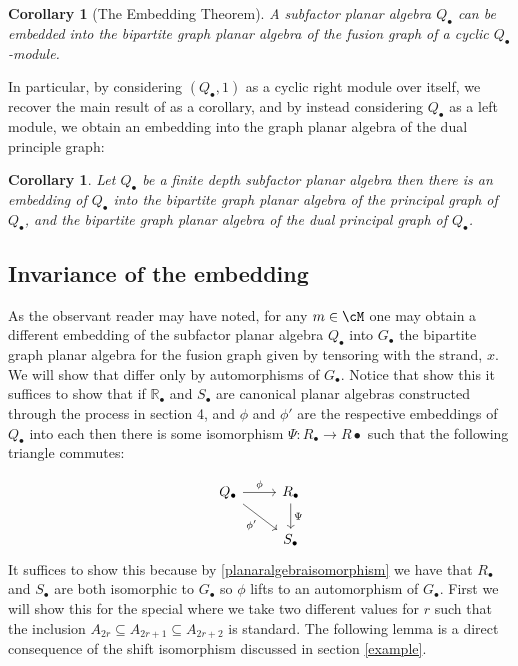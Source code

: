 \documentclass[11pt]{article}
\theoremstyle{plain}
\newtheorem{cor}[thm]{Corollary}
\theoremstyle{definition}
\newcommand{\R}{\mathbb{R}}
\begin{document}
\begin{cor}[The Embedding Theorem]
	A subfactor planar algebra $Q_\bullet$ can be embedded into the bipartite graph planar algebra of the fusion graph of a cyclic $Q_\bullet$-module.
\end{cor}

In particular, by considering $(Q_\bullet,1)$ as a cyclic right module over itself, we recover the main result of \cite{MR2812459} as a corollary, and by instead considering $Q_\bullet$ as a left module, we obtain an embedding into the graph planar algebra of the dual principle graph: 

\begin{cor}
Let $Q_{\bullet}$ be a finite depth subfactor planar algebra then there is an embedding of $Q_{\bullet}$ into the bipartite graph planar algebra of the principal graph of $Q_{\bullet}$, and the bipartite graph planar algebra of the dual principal graph of $Q_{\bullet}$.
\end{cor}

\subsection{Invariance of the embedding}
As the observant reader may have noted, for any $m\in \cM$ one may obtain a different embedding of the subfactor planar algebra $Q_\bullet$ into $G_{\bullet}$ the bipartite graph planar algebra for the fusion graph given by tensoring with the strand, $x$. We will show that differ only by automorphisms of $G_{\bullet}$. Notice that show this it suffices to show that if $\R_{\bullet}$ and $S_{\bullet}$ are canonical planar algebras constructed through the process in section 4, and $\phi$ and $\phi'$ are the respective embeddings of $Q_{\bullet}$ into each then there is some isomorphism $\Psi:R_{\bullet}\rightarrow R{\bullet}$ such that the following triangle commutes:

$$
  \begin{tikzcd}
    Q_{\bullet} \arrow{r}{\phi} \arrow[swap]{dr}{\phi'} & R_{\bullet} \arrow{d}{\Psi} \\
     & S_{\bullet}
  \end{tikzcd}
$$  
It suffices to show this because by \ref{planaralgebraisomorphism} we have that $R_{\bullet}$ and $S_{\bullet}$ are both isomorphic to $G_{\bullet}$ so $\phi$ lifts to an automorphism of $G_{\bullet}$. First we will show this for the special where we take two different values for $r$ such that the inclusion $A_{2r}\subseteq A_{2r+1}\subseteq A_{2r+2}$ is standard. The following lemma is a direct consequence of the shift isomorphism discussed in section \ref{example}.
\end{document}
